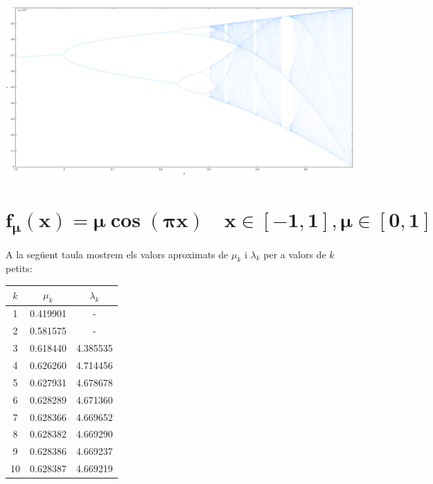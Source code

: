 \documentclass[a4paper]{article}
\theoremstyle{definition}
\begin{document}
\begin{center}
  \begin{minipage}{\linewidth}
    \centering
    \includegraphics[width=0.8\linewidth]{Images/map3.png}
  \end{minipage}
\end{center}
\newpage
\section{\texorpdfstring{$\boldsymbol{f_\mu(x)=\mu \cos(\pi x)\quad x\in[-1,1], \mu\in[0,1]}$}{f4}}

A la següent taula mostrem els valors aproximats de $\mu_k$ i $\lambda_k$ per a valors de $k$ petits:
\begin{table}[ht]
  \centering
  \begin{tabular}{c|c|c}
    $k$ & $\mu_k$  & $\lambda_k$ \\
    \hline
    \hline
    1   & 0.419901 & -           \\
    2   & 0.581575 & -           \\
    3   & 0.618440 & 4.385535    \\
    4   & 0.626260 & 4.714456    \\
    5   & 0.627931 & 4.678678    \\
    6   & 0.628289 & 4.671360    \\
    7   & 0.628366 & 4.669652    \\
    8   & 0.628382 & 4.669290    \\
    9   & 0.628386 & 4.669237    \\
    10  & 0.628387 & 4.669219
  \end{tabular}
\end{table}
\end{document}
